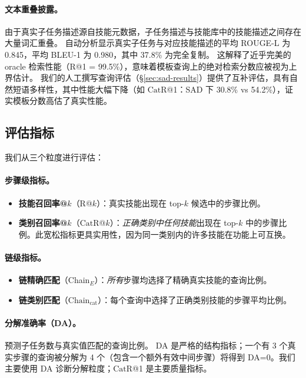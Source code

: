 \documentclass[11pt,a4paper]{ctexart}
\newcommand{\catrecall}{\text{CatR}}
\newcommand{\chaincat}{\text{Chain}_\text{cat}}
\begin{document}
\paragraph{文本重叠披露。}
由于真实子任务描述源自技能元数据，子任务描述与技能库中的技能描述之间存在大量词汇重叠。
自动分析显示真实子任务与对应技能描述的平均 ROUGE-L 为 0.845，平均 BLEU-1 为 0.980，其中 37.8\% 为完全复制。
这解释了近乎完美的 oracle 检索性能（R@1 = 99.5\%），意味着模板查询上的绝对检索分数应被视为上界估计。
我们的人工撰写查询评估（\S\ref{sec:sad-results}）提供了互补评估，具有自然短语多样性，其中性能大幅下降（如 $\catrecall$@1：SAD 下 30.8\% vs 54.2\%），证实模板分数高估了真实性能。

\subsection{评估指标}

我们从三个粒度进行评估：

\paragraph{步骤级指标。}
\begin{itemize}[nosep,leftmargin=*]
  \item \textbf{技能召回率@$k$}（R@$k$）：真实技能出现在 top-$k$ 候选中的步骤比例。
  \item \textbf{类别召回率@$k$}（$\catrecall$@$k$）：\emph{正确类别中任何技能}出现在 top-$k$ 中的步骤比例。此宽松指标更具实用性，因为同一类别内的许多技能在功能上可互换。
\end{itemize}

\paragraph{链级指标。}
\begin{itemize}[nosep,leftmargin=*]
  \item \textbf{链精确匹配}（Chain$_E$）：\emph{所有}步骤均选择了精确真实技能的查询比例。
  \item \textbf{链类别匹配}（$\chaincat$）：每个查询中选择了正确类别技能的步骤平均比例。
\end{itemize}

\paragraph{分解准确率（DA）。}预测子任务数与真实值匹配的查询比例。
DA 是严格的结构指标；一个有 3 个真实步骤的查询被分解为 4 个（包含一个额外有效中间步骤）将得到 DA=0。我们主要使用 DA 诊断分解粒度；$\catrecall$@1 是主要质量指标。
\end{document}
